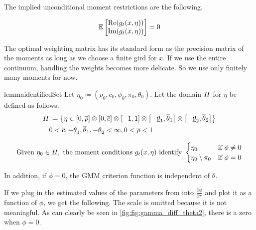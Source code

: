 \documentclass[11pt, letterpaper, twoside, final]{article}
\begin{document}
The implied unconditional moment restrictions are the following.  

\begin{equation}
    \operatorname{\mathbb{E}} \begin{bmatrix}  \mathrm{Re} (g_t(x, \eta)) \\ \mathrm{Im} (g_t(x, \eta)) \end{bmatrix} = 0
\end{equation}


The optimal weighting matrix has its standard form as the precision matrix of the moments as long as we choose a
finite gird for $x$. 
If we use the entire continuum, handling the weights becomes more delicate. 
So we use only finitely many moments for now.


\begin{restatable}{lemma}{identifiedSet}
    \label{lemma:IdentifiedSet}
    Let $\eta_0 \coloneqq \left(\rho_0, c_0, \phi_0, \pi_0, \theta_0\right)$.
    Let the domain $H$ for $\eta$ be defined as follows. 
    \begin{equation}
    \begin{split}
        H &\coloneqq \left\{ \eta \in  [0, \overline{\rho}] \otimes [0, \overline{c}] \otimes \left[-1,
            1\right] \otimes \left[-\underline{\theta}_1, \overline{\theta}_1\right] \otimes
            \left[-\underline{\theta}_2, \overline{\theta}_2\right]\right\} \\
        &0 < \overline{c}, -\underline{\theta}_1, \overline{\theta}_1, -\underline{\theta}_2 < \infty, 0 <
            \overline{\rho} < 1
    \end{split}
    \end{equation}


    \begin{equation}
        \text{Given}\ \eta_0 \in \Eta,\ \text{the moment conditions}\ g_t(x, \eta)\ \text{identify}\
    \begin{cases}
        \eta_0                  &\text{if}\ \phi \neq 0 \\
        \eta_0 \setminus \pi_0  &\text{if}\ \phi = 0
    \end{cases}
    \label{eqn:EtaDefn}
    \end{equation}

    In addition, if $\phi = 0$, the GMM criterion function is independent of $\theta$.
\end{restatable}


If we plug in the estimated values of the parameters from \textcite{khrapov2016affine} into $\frac{\partial
\phi}{\partial \pi}$ and plot it as a function of $\phi$,  we get the following.
The scale is omitted because it is not meaningful. 
As can clearly be seen in \cref{fig:fig:gamma_diff_theta2}, there is a zero when $\phi = 0$.
\end{document}
